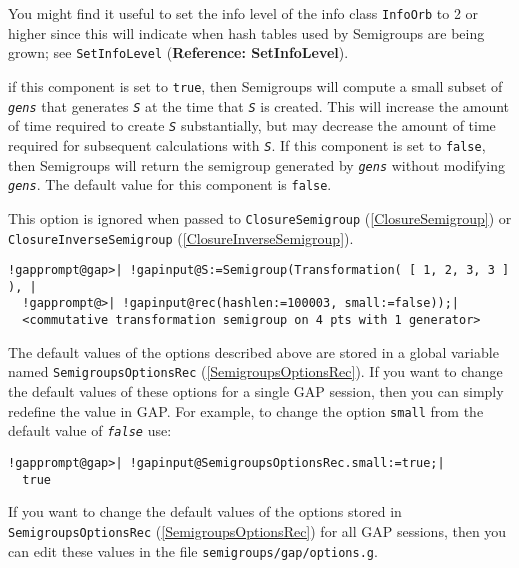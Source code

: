 \documentclass[a4paper,11pt]{report}
\begin{document}
{{\begin{description}
 You might find it useful to set the info level of the info class \texttt{InfoOrb} to 2 or higher since this will indicate when hash tables used by \textsf{Semigroups} are being grown; see \texttt{SetInfoLevel} (\textbf{Reference: SetInfoLevel}). 
\item[{\texttt{small}}] if this component is set to \texttt{true}, then \textsf{Semigroups} will compute a small subset of \mbox{\texttt{\mdseries\slshape gens}} that generates \mbox{\texttt{\mdseries\slshape S}} at the time that \mbox{\texttt{\mdseries\slshape S}} is created. This will increase the amount of time required to create \mbox{\texttt{\mdseries\slshape S}} substantially, but may decrease the amount of time required for subsequent
calculations with \mbox{\texttt{\mdseries\slshape S}}. If this component is set to \texttt{false}, then \textsf{Semigroups} will return the semigroup generated by \mbox{\texttt{\mdseries\slshape gens}} without modifying \mbox{\texttt{\mdseries\slshape gens}}. The default value for this component is \texttt{false}.

 This option is ignored when passed to \texttt{ClosureSemigroup} (\ref{ClosureSemigroup}) or \texttt{ClosureInverseSemigroup} (\ref{ClosureInverseSemigroup}). 
\end{description}
 
\begin{Verbatim}[commandchars=!@|,fontsize=\small,frame=single,label=Example]
  !gapprompt@gap>| !gapinput@S:=Semigroup(Transformation( [ 1, 2, 3, 3 ] ), |
  !gapprompt@>| !gapinput@rec(hashlen:=100003, small:=false));|
  <commutative transformation semigroup on 4 pts with 1 generator>
\end{Verbatim}
 The default values of the options described above are stored in a global
variable named \texttt{SemigroupsOptionsRec} (\ref{SemigroupsOptionsRec}). If you want to change the default values of these options for a single \textsf{GAP} session, then you can simply redefine the value in \textsf{GAP}. For example, to change the option \texttt{small} from the default value of \mbox{\texttt{\mdseries\slshape false}} use: 
\begin{Verbatim}[commandchars=!@|,fontsize=\small,frame=single,label=Example]
  !gapprompt@gap>| !gapinput@SemigroupsOptionsRec.small:=true;|
  true
\end{Verbatim}
 If you want to change the default values of the options stored in \texttt{SemigroupsOptionsRec} (\ref{SemigroupsOptionsRec}) for all \textsf{GAP} sessions, then you can edit these values in the file \texttt{semigroups/gap/options.g}. 

}}
\end{document}

